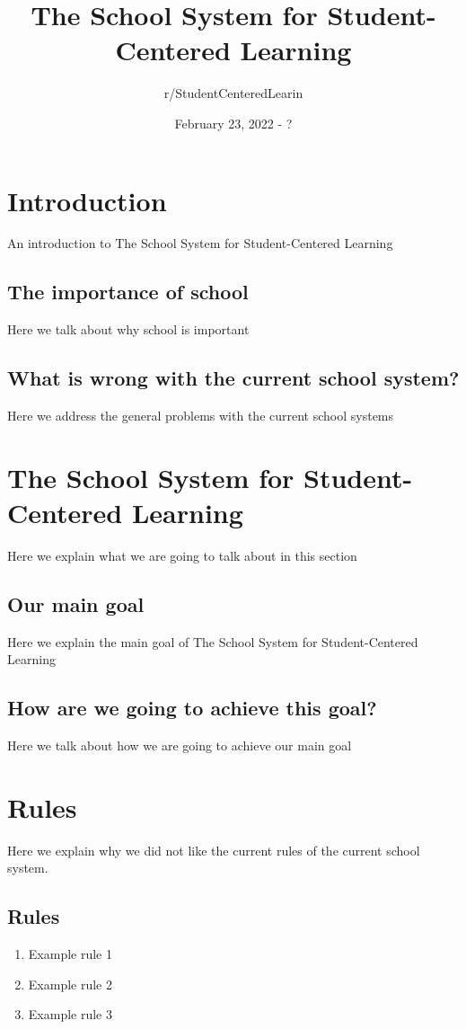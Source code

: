 \documentclass[titlepage]{article}
\author{r/StudentCenteredLearin}
\title{The School System for Student-Centered Learning}
\date{February 23, 2022 - ?}
\begin{document}
\maketitle
\newpage
\tableofcontents
\newpage
\section{Introduction}
An introduction to The School System for Student-Centered Learning
\subsection{The importance of school}
Here we talk about why school is important
\subsection{What is wrong with the current school system?}
Here we address the general problems with the current school systems


\newpage
\section{The School System for Student-Centered Learning}
Here we explain what we are going to talk about in this section
\subsection{Our main goal}
Here we explain the main goal of The School System for Student-Centered Learning
\subsection{How are we going to achieve this goal?}
Here we talk about how we are going to achieve our main goal

\newpage
\section{Rules}
Here we explain why we did not like the current rules of the current school system.
\subsection{Rules}
\begin{enumerate}
	\item Example rule 1
	\item Example rule 2
	\item Example rule 3
\end{enumerate}
\end{document}
